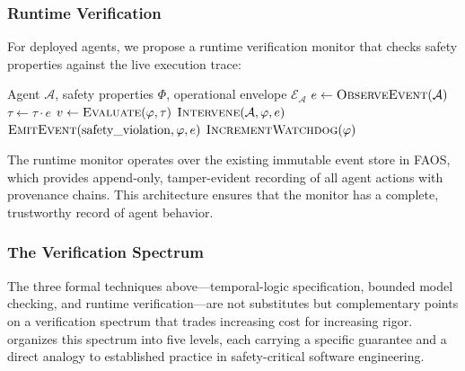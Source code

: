 \documentclass[11pt,a4paper]{article}
\newcommand{\faos}{\textsc{FAOS}}
\newcommand{\agent}{\mathcal{A}}
\newcommand{\env}{\mathcal{E}}
\newcommand{\prop}{\varphi}
\begin{document}
\subsubsection{Runtime Verification}

For deployed agents, we propose a runtime verification monitor
\citep{leucker2009brief, bartocci2018specification} that checks
safety properties against the live execution trace:

\begin{algorithm}
\caption{Runtime Safety Monitor}
\label{alg:runtime-monitor}
\begin{algorithmic}[1]
\REQUIRE Agent $\agent$, safety properties $\Phi$,
  operational envelope $\env_\agent$
\LOOP
  \STATE $e \gets \textsc{ObserveEvent}(\agent)$
  \STATE $\tau \gets \tau \cdot e$
  \FORALL{$\prop \in \Phi$}
    \STATE $v \gets \textsc{Evaluate}(\prop, \tau)$
      \STATE $\textsc{Intervene}(\agent, \prop, e)$
      \STATE $\textsc{EmitEvent}(\text{safety\_violation},
        \prop, e)$
      \STATE $\textsc{IncrementWatchdog}(\prop)$
    \ENDIF
  \ENDFOR
\ENDLOOP
\end{algorithmic}
\end{algorithm}

The runtime monitor operates over the existing immutable event
store in \faos{}, which provides append-only, tamper-evident
recording of all agent actions with provenance chains. This
architecture ensures that the monitor has a complete, trustworthy
record of agent behavior.

\subsubsection{The Verification Spectrum}
\label{sec:verification-spectrum}

The three formal techniques above---temporal-logic specification,
bounded model checking, and runtime verification---are not
substitutes but complementary points on a verification spectrum that
trades increasing cost for increasing rigor.
 organizes this spectrum into five
levels, each carrying a specific guarantee and a direct analogy to
established practice in safety-critical software engineering.
\end{document}
